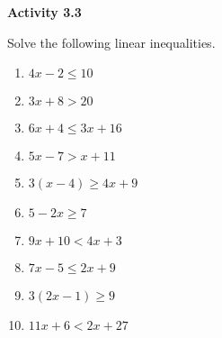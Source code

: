  \vspace{1ex}
\noindent\textbf{Activity 3.3}

\vspace{0.75ex}

Solve the following linear inequalities.%
\begin{multicols}{2}
\begin{enumerate}[noitemsep, label = \color{blue}\arabic*. ]    \item $4x - 2 \leq 10$
    \item $3x + 8 > 20$
    \item $6x + 4 \leq 3x + 16$
    \item $5x - 7 > x + 11$
    \item $3(x - 4) \geq 4x + 9$
    \item $5 - 2x \geq 7$
    \item $9x + 10 < 4x + 3$
    \item $7x - 5 \leq 2x + 9$
    \item $3(2x - 1) \geq 9$
    \item $11x + 6 < 2x + 27$
\end{enumerate}
\end{multicols}


